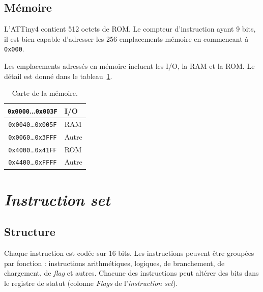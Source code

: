\documentclass[11pt]{article}
\begin{document}
\subsection{Mémoire}\label{sec:memoire}
L'ATTiny4 contient 512 octets de ROM. Le compteur d'instruction
ayant 9 bits, il est bien capable d'adresser les 256
emplacements mémoire en commencant à \texttt{0x000}.

Les emplacements adressés en mémoire incluent les I/O, la RAM et la
ROM. Le détail est donné dans le tableau~\ref{tab:memory-map}.
\begin{table}[htbp]
  \centering
  \begin{tabular}{|c|l|}
\hline
    \texttt{0x0000}…\texttt{0x003F} & I/O \\
\hline
    \texttt{0x0040}…\texttt{0x005F} & RAM \\
\hline
    \texttt{0x0060}…\texttt{0x3FFF} & Autre \\
\hline
    \texttt{0x4000}…\texttt{0x41FF} & ROM \\
\hline
    \texttt{0x4400}…\texttt{0xFFFF} & Autre \\
\hline
  \end{tabular}
  \caption{Carte de la mémoire.}
  \label{tab:memory-map}
\end{table}

\section{\emph{Instruction set}}
\subsection{Structure}
Chaque instruction est codée sur 16 bits. Les instructions peuvent être groupées par
fonction : instructions arithmétiques, logiques, de branchement, de chargement,
de \emph{flag} et autres. Chacune des instructions peut altérer des
bits dans le registre de statut (colonne \emph{Flags} de l'\emph{instruction set}).
\end{document}
